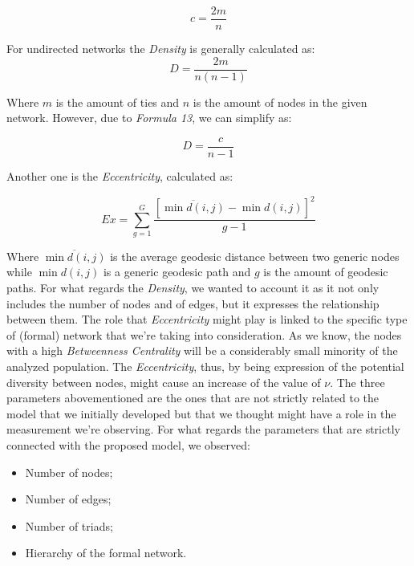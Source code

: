 \documentclass{article}
\begin{document}
\begin{equation}
c=\frac{2m}{n}
\end{equation}

For undirected networks the \emph{Density} is generally calculated as:
\begin{equation}
D=\frac{2m}{n(n-1)}
\end{equation}


Where $m$ is the amount of ties and $n$ is the amount of nodes in the given network. However, due to \emph{Formula 13}, we can simplify as:

\begin{equation}
D=\frac{c}{n-1}
\end{equation}


Another one is the \emph{Eccentricity}, calculated as:

\begin{equation}
Ex=\sum_{g=1}^{G}\frac{[\overline{\min d(i,j)}-\min d(i,j)]^2}{g-1}
\end{equation}


Where $\overline{\min{d\left(i,j\right)}}$ is the average geodesic distance between two generic nodes while $\min{d(i,j)}$ is a generic geodesic path and $g$ is the amount of geodesic paths.
For what regards the \emph{Density}, we wanted to account it as it not only includes the number of nodes and of edges, but it expresses the relationship between them. 
The role that \emph{Eccentricity} might play is linked to the specific type of (formal) network that we’re taking into consideration. As we know, the nodes with a high \emph{ Betweenness Centrality} will be a considerably small minority of the analyzed population. The \emph{Eccentricity}, thus, by being expression of the potential diversity between nodes, might cause an increase of the value of $\nu$.
The three parameters abovementioned are the ones that are not strictly related to the model that we initially developed but that we thought might have a role in the measurement we’re observing. For what regards the parameters that are strictly connected with the proposed model, we observed:
\begin{itemize}
	\item Number of nodes;
	\item Number of edges;
	\item Number of triads;
	\item Hierarchy of the formal network.
\end{itemize}
\end{document}
